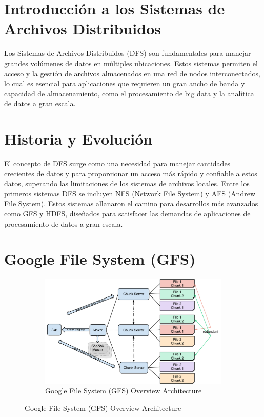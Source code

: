\section{Introducción a los Sistemas de Archivos Distribuidos}

Los Sistemas de Archivos Distribuidos (DFS) son fundamentales para manejar grandes volúmenes de datos en múltiples ubicaciones. Estos sistemas permiten el acceso y la gestión de archivos almacenados en una red de nodos interconectados, lo cual es esencial para aplicaciones que requieren un gran ancho de banda y capacidad de almacenamiento, como el procesamiento de big data y la analítica de datos a gran escala.

\section{Historia y Evolución}

El concepto de DFS surge como una necesidad para manejar cantidades crecientes de datos y para proporcionar un acceso más rápido y confiable a estos datos, superando las limitaciones de los sistemas de archivos locales. Entre los primeros sistemas DFS se incluyen NFS (Network File System) y AFS (Andrew File System). Estos sistemas allanaron el camino para desarrollos más avanzados como GFS y HDFS, diseñados para satisfacer las demandas de aplicaciones de procesamiento de datos a gran escala.

\section{Google File System (GFS)}

\begin{figure}[H]
    \centering
    \begin{subfigure}[b]{0.5\textwidth}
        \centering
        \includegraphics[width=\textwidth]{Figures/1. Content/GoogleFileSystemGFS.png}
        \caption{Google File System (GFS) Overview Architecture}
        \label{fig: GFSArchitecture}
    \end{subfigure}
    \hfill
\end{figure}

